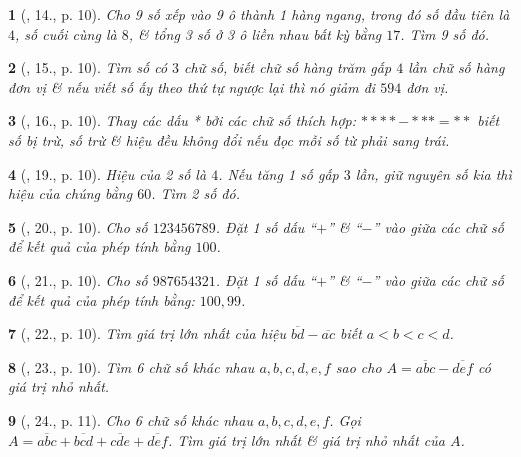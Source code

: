 \documentclass{article}
\newtheorem{baitoan}{}
\begin{document}
\begin{baitoan}[\cite{Binh_Toan_6_tap_1}, 14., p. 10]
	Cho 9 số xếp vào 9 ô thành 1 hàng ngang, trong đó số đầu tiên là $4$, số cuối cùng là $8$, \& tổng 3 số ở 3 ô liền nhau bất kỳ bằng $17$. Tìm 9 số đó.
\end{baitoan}

\begin{baitoan}[\cite{Binh_Toan_6_tap_1}, 15., p. 10]
	Tìm số có $3$ chữ số, biết chữ số hàng trăm gấp $4$ lần chữ số hàng đơn vị \& nếu viết số ấy theo thứ tự ngược lại thì nó giảm đi $594$ đơn vị.
\end{baitoan}

\begin{baitoan}[\cite{Binh_Toan_6_tap_1}, 16., p. 10]
	Thay các dấu * bởi các chữ số thích hợp: $**** - *** = **$ biết số bị trừ, số trừ \& hiệu đều không đổi nếu đọc mỗi số từ phải sang trái.
\end{baitoan}

\begin{baitoan}[\cite{Binh_Toan_6_tap_1}, 19., p. 10]
	Hiệu của 2 số là $4$. Nếu tăng 1 số gấp $3$ lần, giữ nguyên số kia thì hiệu của chúng bằng $60$. Tìm 2 số đó.
\end{baitoan}

\begin{baitoan}[\cite{Binh_Toan_6_tap_1}, 20., p. 10]
	Cho số $123456789$. Đặt 1 số dấu ``$+$'' \& ``$-$'' vào giữa các chữ số để kết quả của phép tính bằng $100$.
\end{baitoan}

\begin{baitoan}[\cite{Binh_Toan_6_tap_1}, 21., p. 10]
	Cho số $987654321$. Đặt 1 số dấu ``$+$'' \& ``$-$'' vào giữa các chữ số để kết quả của phép tính bằng: $100,99$.
\end{baitoan}

\begin{baitoan}[\cite{Binh_Toan_6_tap_1}, 22., p. 10]
	Tìm giá trị lớn nhất của hiệu $\overline{bd} - \overline{ac}$ biết $a < b < c < d$.
\end{baitoan}

\begin{baitoan}[\cite{Binh_Toan_6_tap_1}, 23., p. 10]
	Tìm 6 chữ số khác nhau $a,b,c,d,e,f$ sao cho $A = \overline{abc} - \overline{def}$ có giá trị nhỏ nhất.
\end{baitoan}

\begin{baitoan}[\cite{Binh_Toan_6_tap_1}, 24., p. 11]
	Cho 6 chữ số khác nhau $a,b,c,d,e,f$. Gọi $A = \overline{abc} + \overline{bcd} + \overline{cde} + \overline{def}$. Tìm giá trị lớn nhất \& giá trị nhỏ nhất của $A$.
\end{baitoan}
\end{document}
